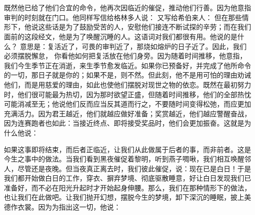 

\section{}

\par

\par

既然他已给了他们合宜的命令，他再次因临近的催促，推动他们行善。因为他意指审判的时刻就在门口。他同样写信给格林多人说：  又写给希伯来人：  但在那些情形下，他说这些话是为了鼓励受苦的人，安慰他们接连不断试探的辛劳；而在我们面前的这段经文，他是为了唤醒沉睡的人。这语词对我们都很有用。他说的是什么？ 意思是：复活近了，可畏的审判近了，那烧如熔炉的日子近了。因此，我们必须摆脱懈怠， 你看他如何把复活放在他们身旁。因为随着时间推移，他意指，我们今生季节正在消逝，来生季节愈发临近。如果你已预备好，并完成了他所命令的一切，那日子就是你的；如果不是，则不然。但此刻，他不是用可怕的理由劝诫他们，而是用慈爱的理由，如此也使他们摆脱对现世之物的依恋。既然在最初努力时，他们很可能最为热切，因为那时欲望正盛，但随着时间推移，他们的全部热忱可能消减至无；他说他们反而应当反其道而行之，不要随时间变得松弛，而应更加充满活力。因为君王越近，他们就越应做好准备；奖赏越近，他们越应警醒奋战，因为连赛跑者也如此：当接近终点、即将接受奖品时，他们会更加振奋。这就是为什么他说：\par

 \par

如果这事即将结束，而后者正临近，让我们从此做属于后者的事，而非前者。这是今生之事中的做法。当我们看到黑夜催促着黎明，听到燕子啁啾，我们相互唤醒邻人，尽管还是夜晚。但当夜真正离去时，我们彼此催促，说：现在已是白日！于是我们都开始做白日的工作，穿衣、摒弃梦境、彻底驱散睡意，好让白日发现我们已准备好，而不必在阳光升起时才开始起身伸腰。那么，我们在那种情形下的做法，也让我们在此做吧。让我们抛开幻想，摆脱今生的梦境，卸下深沉的睡眠，披上美德作衣裳。因为为指出这一切，他说：\par

